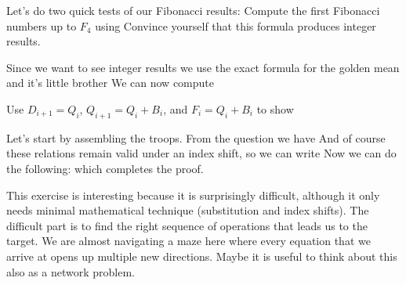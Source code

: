 %
\label{exBeesFibonacci}%
Let's do two quick tests of our Fibonacci results:
\subquestion
Compute the first Fibonacci numbers up to $F_4$ using 
Convince yourself that this formula produces integer results. 

\solution 
Since we want to see integer results we use the exact formula for the golden mean and it's little brother
We can now compute 

\subquestion 
Use $D_{i+1}=Q_i$, $Q_{i+1}=Q_i+B_i$, and $F_i=Q_i+B_i$ to show 

\solution
Let's start by assembling the troops. From the question we have 
And of course these relations remain valid under an index shift, so we can write
Now we can do the following:
which completes the proof. 

This exercise is interesting because it is surprisingly difficult, although it only needs minimal mathematical technique (substitution and index shifts). The difficult part is to find the right sequence of operations that leads us to the target. We are almost navigating a maze here where every equation that we arrive at opens up multiple new directions. Maybe it is useful to think about this also as a network problem.
